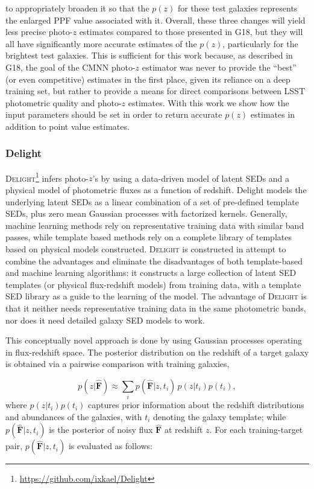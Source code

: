 \noindent to appropriately broaden it so that the $p(z)$ for these test galaxies represents the enlarged PPF value associated with it. Overall, these three changes will yield less precise photo-$z$ estimates compared to those presented in G18, but they will all have significantly more accurate estimates of the $p(z)$, particularly for the brightest test galaxies. This is sufficient for this work because, as described in G18, the goal of the \textsc{CMNN} photo-$z$ estimator was never to provide the ``best'' (or even competitive) estimates in the first place, given its reliance on a deep training set, but rather to provide a means for direct comparisons between LSST photometric quality and photo-$z$ estimates. With this work we show how the input parameters should be set in order to return accurate $p(z)$ estimates in addition to point value estimates.


\subsubsection{Delight}
\label{sec:delight}

\textsc{Delight}\footnote{\url{https://github.com/ixkael/Delight}} \citep{Leistedt:17} infers photo-$z$'s by using a data-driven model of latent SEDs and a physical model of photometric fluxes as a function of redshift. Delight models the underlying latent SEDs as a linear combination of a set of pre-defined template SEDs, plus zero mean Gaussian processes with factorized kernels.  Generally, machine learning methods rely on representative training data with similar band passes, while template based methods rely on a complete library of templates based on physical models constructed. \textsc{Delight} is constructed in attempt to combine the advantages and eliminate the disadvantages of both template-based and machine learning algorithms: it constructs a large collection of latent SED templates (or physical flux-redshift models) from training data, with a template SED library as a guide to the learning of the model. The advantage of \textsc{Delight} is that it neither needs representative training data in the same photometric bands, nor does it need detailed galaxy SED models to work.

This conceptually novel approach is done by using Gaussian processes operating in flux-redshift space. The posterior distribution on the redshift of a target galaxy is obtained via a pairwise comparison with training galaxies,

\begin{equation}
p(z|\mathbf{\hat{F}}) \approx \sum_i p(\mathbf{\hat{F}}|z,t_i)\, p(z|t_i)p(t_i),
\end{equation}
\noindent where $p(z|t_i)p(t_i)$ captures prior information about the redshift distributions and abundances of the galaxies, with $t_i$ denoting the galaxy template; while $p(\mathbf{\hat{F}}|z,t_i)$ is the posterior of noisy flux $\mathbf{\hat{F}}$ at redshift $z$. For each training-target pair, $p(\mathbf{\hat{F}}|z,t_i)$ is evaluated as follows:

